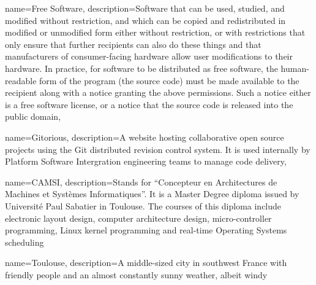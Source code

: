 {
  name=Free Software,
  description={Software that can be used, studied, and modified
    without restriction, and which can be copied and redistributed in
    modified or unmodified form either without restriction, or with
    restrictions that only ensure that further recipients can also do
    these things and that manufacturers of consumer-facing hardware
    allow user modifications to their hardware. In practice, for
    software to be distributed as free software, the human-readable
    form of the program (the source code) must be made available to
    the recipient along with a notice granting the above
    permissions. Such a notice either is a free software license, or a
    notice that the source code is released into the public domain},
}

{
  name=Gitorious,
  description={A website hosting collaborative open source projects
    using the Git distributed revision control system. It is used
    internally by Platform Software Intergration engineering teams to
    manage code delivery},
}




{
  name=CAMSI,
  description={Stands for ``Concepteur en Architectures de Machines et
    Systèmes Informatiques''. It is a Master Degree diploma
    issued by Université Paul Sabatier in Toulouse. The courses of this
    diploma include electronic layout design, computer architecture design,
    micro-controller programming, Linux kernel programming and
    real-time Operating Systems scheduling}
}


{
  name=Toulouse,
  description={A middle-sized city in southwest France with friendly
    people and an almost constantly sunny weather, albeit windy}
}

